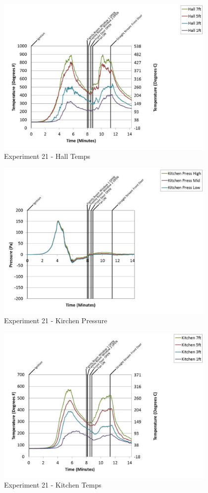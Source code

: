 \documentclass{article}
\begin{document}
\begin{appendices}
	\clearpage

	\begin{figure}[h!]
		\centering
		\includegraphics[height=3.05in]{0_Images/Results_Charts/Exp_21_Charts/HallTemps.pdf}
		\caption{Experiment 21 - Hall Temps}
	\end{figure}
 

	\begin{figure}[h!]
		\centering
		\includegraphics[height=3.05in]{0_Images/Results_Charts/Exp_21_Charts/KirchenPressure.pdf}
		\caption{Experiment 21 - Kirchen Pressure}
	\end{figure}
 
	\clearpage

	\begin{figure}[h!]
		\centering
		\includegraphics[height=3.05in]{0_Images/Results_Charts/Exp_21_Charts/KitchenTemps.pdf}
		\caption{Experiment 21 - Kitchen Temps}
	\end{figure}
 


\end{appendices}
\end{document}
